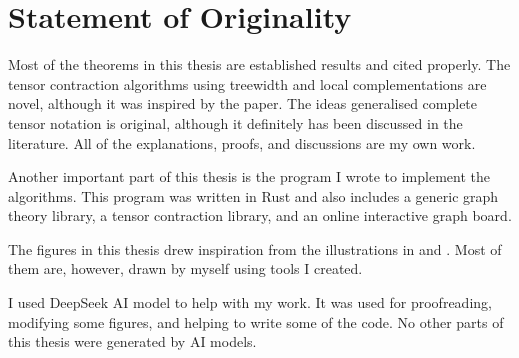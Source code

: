 \section{Statement of Originality}

Most of the theorems in this thesis are established results and cited properly. 
The tensor contraction algorithms using treewidth and local complementations are novel, although it was inspired by the paper. 
The ideas generalised complete tensor notation is original, although it definitely has been discussed in the literature.
All of the explanations, proofs, and discussions are my own work.

Another important part of this thesis is the program I wrote to implement the algorithms. 
This program was written in Rust and also includes a generic graph theory library, a tensor contraction library, and an online interactive graph board.

The figures in this thesis drew inspiration from the illustrations in \cite{KissingerWetering2024Book} and \cite{waintal2026competequantumcomputerslecture}. Most of them are, however, drawn by myself using tools I created.

I used DeepSeek AI model to help with my work.
It was used for proofreading, modifying some figures, and helping to write some of the code. 
No other parts of this thesis were generated by AI models.
